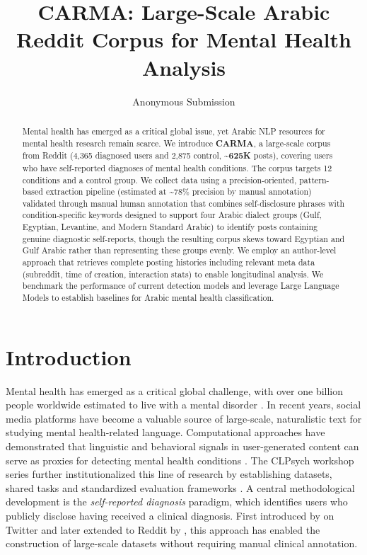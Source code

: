 \documentclass[letterpaper]{article} %
\title{CARMA: Large-Scale Arabic Reddit Corpus for Mental Health Analysis}
\author{
    Anonymous Submission
}
\begin{document}
\maketitle

\begin{abstract}
Mental health has emerged as a critical global issue, yet Arabic NLP resources for mental health research remain scarce. We introduce \textbf{CARMA}, a large-scale corpus from Reddit (4,365 diagnosed users and 2,875 control, \textbf{\textasciitilde625K} posts), covering users who have self-reported diagnoses of mental health conditions. The corpus targets 12 conditions and a control group. We collect data using a precision-oriented, pattern-based extraction pipeline (estimated at \textasciitilde78\% precision by manual annotation) validated
through manual human annotation that combines self-disclosure phrases with condition-specific keywords designed to support four
Arabic dialect groups (Gulf, Egyptian, Levantine, and Modern Standard Arabic) to identify posts containing genuine diagnostic self-reports, though the resulting corpus skews toward Egyptian and Gulf Arabic rather than representing these groups evenly. We employ an author-level approach that retrieves complete posting histories including relevant meta data (subreddit, time of creation, interaction stats) to enable longitudinal analysis. We benchmark the performance of current detection models and leverage Large Language Models to establish baselines for Arabic mental health classification.
\end{abstract}

\section{Introduction}
\label{sec:introduction}
Mental health has emerged as a critical global challenge, with over one billion
people worldwide estimated to live with a mental disorder
\cite{who2025mental}. In recent years, social media platforms have become a valuable source of
large-scale, naturalistic text for studying mental health-related language.
Computational approaches have demonstrated that linguistic and behavioral signals
in user-generated content can serve as proxies for detecting mental health
conditions \cite{de2013predicting, chancellor2020methods}. The CLPsych workshop
series further institutionalized this line of research by establishing datasets, shared tasks and standardized evaluation frameworks \cite{coppersmith2015clpsych}.
A central methodological development is the \textit{self-reported diagnosis}
paradigm, which identifies users who publicly disclose having received a clinical
diagnosis. First introduced by \citet{coppersmith2014quantifying} on Twitter and
later extended to Reddit by \citet{cohan-etal-2018-smhd}, this approach has enabled the
construction of large-scale datasets without requiring manual clinical annotation.
\end{document}
